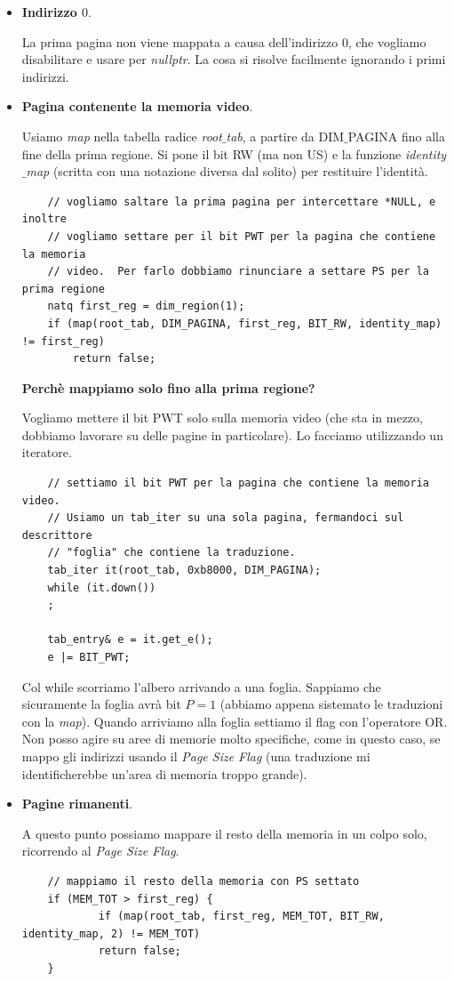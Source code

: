 \documentclass[11pt]{report}
\theoremstyle{definition}
\begin{document}
\begin{itemize}
	\item \textbf{Indirizzo $0$}.
	
	La prima pagina non viene mappata a causa dell'indirizzo $0$, che vogliamo disabilitare e usare per \emph{nullptr}. La cosa si risolve facilmente ignorando i primi indirizzi.
	\item \textbf{Pagina contenente la memoria video}.
	
	Usiamo \emph{map} nella tabella radice \emph{root$\_$tab}, a partire da DIM$\_$PAGINA fino alla fine della prima regione. Si pone il bit RW (ma non US) e la funzione \emph{identity$\_$map} (scritta con una notazione diversa dal solito) per restituire l'identità.
	\begin{verbatim}
	// vogliamo saltare la prima pagina per intercettare *NULL, e inoltre
	// vogliamo settare per il bit PWT per la pagina che contiene la memoria
	// video.  Per farlo dobbiamo rinunciare a settare PS per la prima regione
	natq first_reg = dim_region(1);
	if (map(root_tab, DIM_PAGINA, first_reg, BIT_RW, identity_map) != first_reg)
	    return false;
	\end{verbatim}
	\textbf{Perchè mappiamo solo fino alla prima regione? }
	
	Vogliamo mettere il bit PWT  solo sulla memoria video (che sta in mezzo, dobbiamo lavorare su delle pagine in particolare). Lo facciamo utilizzando un iteratore.
	\begin{verbatim}
	// settiamo il bit PWT per la pagina che contiene la memoria video.
	// Usiamo un tab_iter su una sola pagina, fermandoci sul descrittore
	// "foglia" che contiene la traduzione.
	tab_iter it(root_tab, 0xb8000, DIM_PAGINA);
	while (it.down())
	;
	
	tab_entry& e = it.get_e();
	e |= BIT_PWT;
	\end{verbatim}
	Col while scorriamo l'albero arrivando a una foglia. Sappiamo che sicuramente la foglia avrà bit $P=1$ (abbiamo appena sistemato le traduzioni con la \emph{map}). Quando arriviamo alla foglia settiamo il flag con l'operatore OR. Non posso agire su aree di memorie molto specifiche, come in questo caso, se mappo gli indirizzi usando il \emph{Page Size Flag} (una traduzione mi identificherebbe un'area di memoria troppo grande).
	
	\item \textbf{Pagine rimanenti}. 
	
	A questo punto possiamo mappare il resto della memoria in un colpo solo, ricorrendo al \emph{Page Size Flag}.
	\begin{verbatim}
	// mappiamo il resto della memoria con PS settato
	if (MEM_TOT > first_reg) {
		    if (map(root_tab, first_reg, MEM_TOT, BIT_RW, identity_map, 2) != MEM_TOT)
		    return false;
	}
	\end{verbatim}


\end{itemize}
\end{document}
